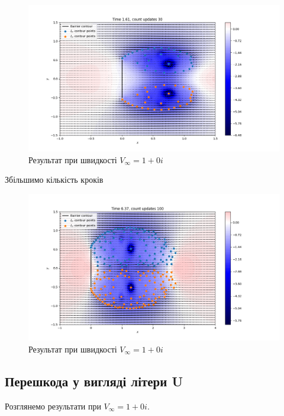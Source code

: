 \documentclass[a4paper,12pt]{article}
\begin{document}
	\begin{figure}[ht]
		\begin{center}\includegraphics[scale=0.45]{plate_30} \end{center}
		\caption{Результат при швидкості $V_{\infty} = 1+0i$}
		\label{fig:result_plate1}
	\end{figure}
	
	Збільшимо кількість кроків
	
	\begin{figure}[]
		\begin{center}\includegraphics[scale=0.45]{plate_100} \end{center}
		\caption{Результат при швидкості $V_{\infty} = 1 +0i$}
		\label{fig:result_plate2}
	\end{figure}
	\newpage
	
	\subsection{Перешкода у вигляді літери U}
	
	Розглянемо результати при $V_{\infty} = 1 +0i$.
	
\end{document}

